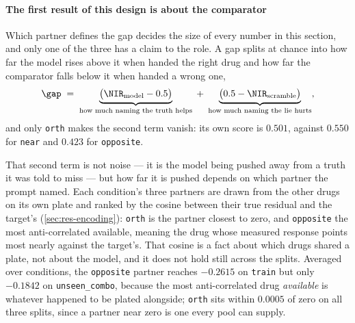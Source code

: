 \paragraph{The first result of this design is about the comparator} Which partner
defines the gap decides the size of every number in this section, and only one of
the three has a claim to the role. A gap splits at chance into how far the model
rises above it when handed the right drug and how far the comparator falls below
it when handed a wrong one,
\begin{equation}
 \gap \;=\; \underbrace{\big(\NIR_{\textrm{model}} - 0.5\big)}_{\textrm{how much naming the truth helps}}
 \;+\; \underbrace{\big(0.5 - \NIR_{\textrm{scramble}}\big)}_{\textrm{how much naming the lie hurts}},
\end{equation}
and only \texttt{orth} makes the second term vanish: its own score is $0.501$,
against $0.550$ for \texttt{near} and $0.423$ for \texttt{opposite}.

That second term is not noise --- it is the model being pushed away from a truth
it was told to miss --- but how far it is pushed depends on which partner the
prompt named. Each condition's three partners are drawn from the other drugs on
its own plate and ranked by the cosine between their true residual and the
target's (\cref{sec:res-encoding}): \texttt{orth} is the partner closest to zero,
and \texttt{opposite} the most anti-correlated available, meaning the drug whose
measured response points most nearly against the target's. That cosine is a fact
about which drugs shared a plate, not about the model, and it does not hold still
across the splits. Averaged over conditions, the \texttt{opposite} partner reaches
$-0.2615$ on \texttt{train} but only $-0.1842$ on \texttt{unseen\_combo}, because
the most anti-correlated drug \emph{available} is whatever happened to be plated
alongside; \texttt{orth} sits within $0.0005$ of zero on all three splits, since a
partner near zero is one every pool can supply.

